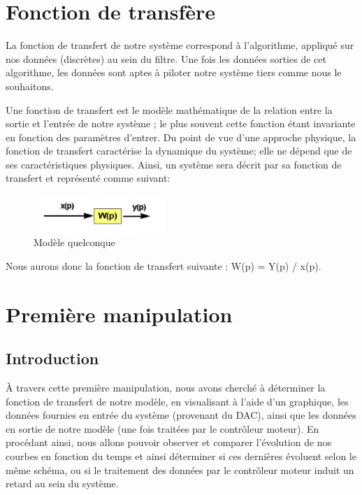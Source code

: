 \documentclass[french,a4paper,12pt]{report}
\begin{document}
		
	\chapter{Fonction de transfère}
	
		La fonction de transfert de notre système correspond à l'algorithme, appliqué sur nos données (discrètes) au sein du filtre. Une fois les données sorties de cet algorithme, les données sont aptes à piloter notre système tiers comme nous le souhaitons.
		
		Une fonction de transfert est le modèle mathématique de la relation entre la sortie et l'entrée de notre système ; le plus souvent cette fonction étant invariante en fonction des paramètres d'entrer.
		Du point de vue d'une approche physique, la fonction de transfert caractérise la dynamique du système; elle ne dépend que de ses caractéristiques physiques. 
		Ainsi, un système sera décrit par sa fonction de transfert et représenté comme suivant:

	\begin{figure}[!ht]
    \center
  	\includegraphics[width=5cm]{transf1.png}
    \caption{Modèle quelconque}
	\end{figure}
	
	Nous aurons donc la fonction de transfert suivante : W(p) = Y(p) / x(p).
	
	\newpage
	
	\chapter{Première manipulation}
	
		\section{Introduction}
	
		À travers cette première manipulation, nous avons cherché à déterminer la fonction de transfert de notre modèle, en visualisant à l'aide d'un graphique, les données fournies en entrée du système (provenant du DAC), ainsi que les données en sortie de notre modèle (une fois traitées par le contrôleur moteur).
		En procédant ainsi, nous allons pouvoir observer et comparer l'évolution de nos courbes en fonction du temps et ainsi déterminer si ces dernières évoluent selon le même schéma, ou si le traitement des données par le contrôleur moteur induit un retard au sein du système.
		
\end{document}
